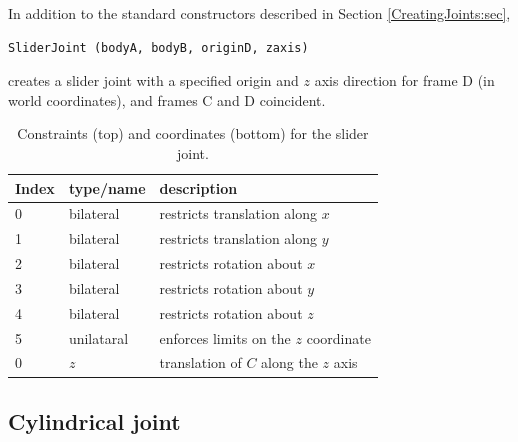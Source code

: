 In addition to the standard constructors described in
Section \ref{CreatingJoints:sec},
\begin{lstlisting}[]
  SliderJoint (bodyA, bodyB, originD, zaxis)
\end{lstlisting}
%
creates a slider joint with a specified origin and $z$ axis direction
for frame D (in world coordinates), and frames C and D coincident.

\begin{table}[h]
\centering
\begin{tabular}{|l|l|l|}
\hline
Index & type/name & description \\
\hline
0 & bilateral & restricts translation along $x$ \\
1 & bilateral & restricts translation along $y$ \\
2 & bilateral & restricts rotation about $x$ \\
3 & bilateral & restricts rotation about $y$ \\
4 & bilateral & restricts rotation about $z$ \\
5 & unilataral & enforces limits on the $z$ coordinate \\
\hline
\hline
0 & $z$ & translation of $C$ along the $z$ axis \\
\hline
\end{tabular}
\caption{Constraints (top) and coordinates (bottom) for the slider joint.}
\label{SliderConstraints:tbl}
\end{table}

\subsection{Cylindrical joint}

